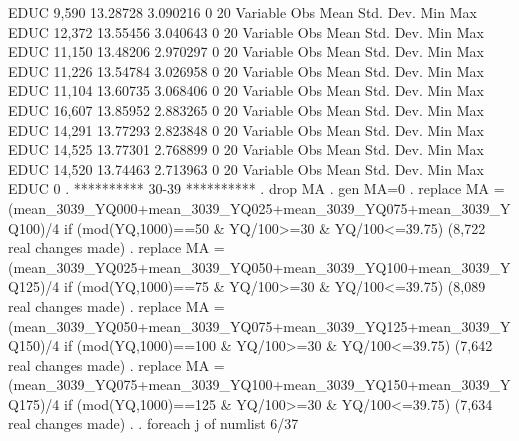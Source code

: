         EDUC {\VBAR}      9,590    13.28728    3.090216          0         20
{\smallskip}
    Variable {\VBAR}        Obs        Mean    Std. Dev.       Min        Max
        EDUC {\VBAR}     12,372    13.55456    3.040643          0         20
{\smallskip}
    Variable {\VBAR}        Obs        Mean    Std. Dev.       Min        Max
        EDUC {\VBAR}     11,150    13.48206    2.970297          0         20
{\smallskip}
    Variable {\VBAR}        Obs        Mean    Std. Dev.       Min        Max
        EDUC {\VBAR}     11,226    13.54784    3.026958          0         20
{\smallskip}
    Variable {\VBAR}        Obs        Mean    Std. Dev.       Min        Max
        EDUC {\VBAR}     11,104    13.60735    3.068406          0         20
{\smallskip}
    Variable {\VBAR}        Obs        Mean    Std. Dev.       Min        Max
        EDUC {\VBAR}     16,607    13.85952    2.883265          0         20
{\smallskip}
    Variable {\VBAR}        Obs        Mean    Std. Dev.       Min        Max
        EDUC {\VBAR}     14,291    13.77293    2.823848          0         20
{\smallskip}
    Variable {\VBAR}        Obs        Mean    Std. Dev.       Min        Max
        EDUC {\VBAR}     14,525    13.77301    2.768899          0         20
{\smallskip}
    Variable {\VBAR}        Obs        Mean    Std. Dev.       Min        Max
        EDUC {\VBAR}     14,520    13.74463    2.713963          0         20
{\smallskip}
    Variable {\VBAR}        Obs        Mean    Std. Dev.       Min        Max
        EDUC {\VBAR}          0
{\smallskip}
. **********  30-39 **********
. drop MA
{\smallskip}
. gen MA=0
{\smallskip}
. replace MA = (mean_3039_YQ000+mean_3039_YQ025+mean_3039_YQ075+mean_3039_YQ100)/4 if (mod(YQ,1000)==50 \& YQ/100>=30 \& YQ/100<=39.75)
(8,722 real changes made)
{\smallskip}
. replace MA = (mean_3039_YQ025+mean_3039_YQ050+mean_3039_YQ100+mean_3039_YQ125)/4 if (mod(YQ,1000)==75 \& YQ/100>=30 \& YQ/100<=39.75)
(8,089 real changes made)
{\smallskip}
. replace MA = (mean_3039_YQ050+mean_3039_YQ075+mean_3039_YQ125+mean_3039_YQ150)/4 if (mod(YQ,1000)==100 \& YQ/100>=30 \& YQ/100<=39.75)
(7,642 real changes made)
{\smallskip}
. replace MA = (mean_3039_YQ075+mean_3039_YQ100+mean_3039_YQ150+mean_3039_YQ175)/4 if (mod(YQ,1000)==125 \& YQ/100>=30 \& YQ/100<=39.75)
(7,634 real changes made)
{\smallskip}
. 
. foreach j of numlist 6/37{\lbr}
